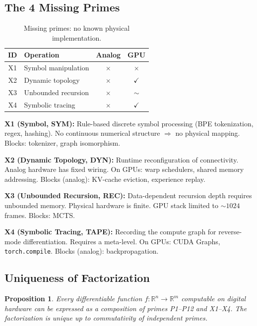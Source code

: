 \documentclass[11pt]{article}
\newtheorem{proposition}{Proposition}
\begin{document}
\subsection{The 4 Missing Primes}

\begin{table}[h]
\centering
\caption{Missing primes: no known physical implementation.}
\label{tab:missing}
\begin{tabular}{clcc}
\toprule
ID & Operation & Analog & GPU \\
\midrule
X1 & Symbol manipulation & $\times$ & $\times$ \\
X2 & Dynamic topology & $\times$ & $\checkmark$ \\
X3 & Unbounded recursion & $\times$ & $\sim$ \\
X4 & Symbolic tracing & $\times$ & $\checkmark$ \\
\bottomrule
\end{tabular}
\end{table}

\textbf{X1 (Symbol, SYM):} Rule-based discrete symbol processing (BPE tokenization, regex, hashing). No continuous numerical structure $\Rightarrow$ no physical mapping. Blocks: tokenizer, graph isomorphism.

\textbf{X2 (Dynamic Topology, DYN):} Runtime reconfiguration of connectivity. Analog hardware has fixed wiring. On GPUs: warp schedulers, shared memory addressing. Blocks (analog): KV-cache eviction, experience replay.

\textbf{X3 (Unbounded Recursion, REC):} Data-dependent recursion depth requires unbounded memory. Physical hardware is finite. GPU stack limited to ${\sim}1024$ frames. Blocks: MCTS.

\textbf{X4 (Symbolic Tracing, TAPE):} Recording the compute graph for reverse-mode differentiation. Requires a meta-level. On GPUs: CUDA Graphs, \texttt{torch.compile}. Blocks (analog): backpropagation.

\subsection{Uniqueness of Factorization}

\begin{proposition}
Every differentiable function $f: \mathbb{R}^n \to \mathbb{R}^m$ computable on digital hardware can be expressed as a composition of primes P1--P12 and X1--X4. The factorization is unique up to commutativity of independent primes.
\end{proposition}
\end{document}
